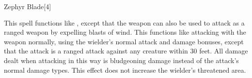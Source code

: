 \begin{spellsection}[Greater]{Zephyr Blade}[4]
    \begin{spellheader}
    \end{spellheader}
    \begin{spellcontent}
        \begin{spelltargetinginfo}
        \end{spelltargetinginfo}
        \begin{spelleffects}
            \spellspecial This spell functions like , except that the weapon can also be used to attack as a ranged weapon by expelling blasts of wind. This functions like attacking with the weapon normally, using the wielder's normal attack and damage bonuses, except that the attack is a ranged attack against any creature within 30 feet. All damage dealt when attacking in this way is bludgeoning damage instead of the attack's normal damage types. This effect does not increase the wielder's threatened area.
            \spelldur \durpersonallong
        \end{spelleffects}
    \end{spellcontent}
    \begin{spellfooter}
        \miscastexplode
    \end{spellfooter}
\end{spellsection}
